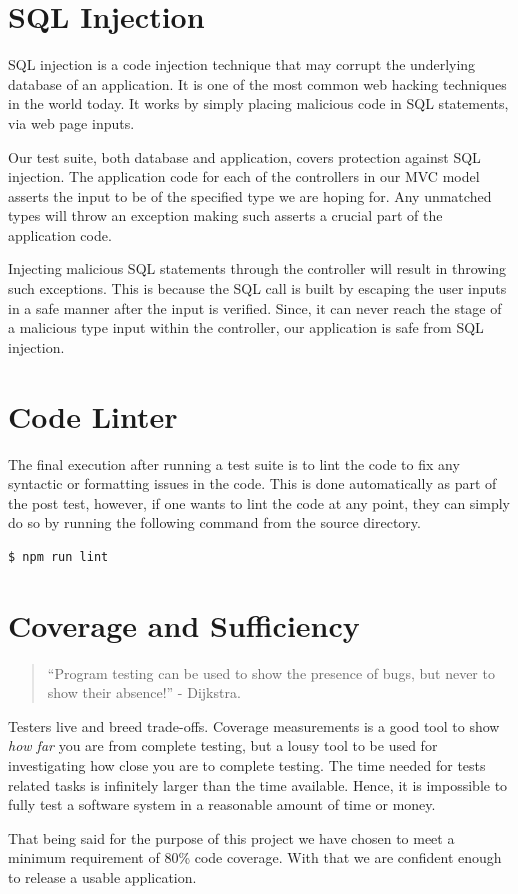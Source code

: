 \documentclass[fontsize=12pt,paper=letter,twoside]{scrartcl}
\begin{document}
\newpage
\section{SQL Injection}
SQL injection is a code injection technique that may corrupt the underlying database of an application. It is one of the most common web hacking techniques in the world today. It works by simply placing malicious code in SQL statements, via web page inputs.

\bigskip
\noindent Our test suite, both database and application, covers protection against SQL injection. The application code for each of the controllers in our MVC model asserts the input to be of the specified type we are hoping for. Any unmatched types will throw an exception making such asserts a crucial part of the application code.

\bigskip
\noindent Injecting malicious SQL statements through the controller will result in throwing such exceptions. This is because the SQL call is built by escaping the user inputs in a safe manner after the input is verified. Since, it can never reach the stage of a malicious type input within the controller, our application is safe from SQL injection.

\section{Code Linter}
The final execution after running a test suite is to lint the code to fix any syntactic or formatting issues in the code. This is done automatically as part of the post test, however, if one wants to lint the code at any point, they can simply do so by running the following command from the source directory.


\begin{lstlisting}[language=bash]
	$ npm run lint
\end{lstlisting}

\section{Coverage and Sufficiency}
\begin{quote}
``Program testing can be used to show the presence of bugs, but never to show their absence!'' - Dijkstra.
\end{quote}

\noindent Testers live and breed trade-offs. Coverage measurements is a good tool to show \emph{how far} you are from complete testing, but a lousy tool to be used for investigating how close you are to complete testing. The time needed for tests related tasks is infinitely larger than the time available. Hence, it is impossible to fully test a software system in a reasonable amount of time or money.

\bigskip
\noindent That being said for the purpose of this project we have chosen to meet a minimum requirement of 80\% code coverage. With that we are confident enough to release a usable application.
\end{document}
